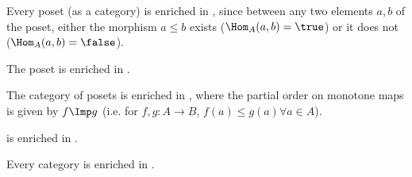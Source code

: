 \begin{example}
    \label{ex:enrichbool}Every poset (as a category) is enriched in \Bool, since between any two elements $a,b$ of the poset, either the morphism $a \leq b$ exists ($\Hom_A(a,b) = \true$) or it does not ($\Hom_A(a,b) = \false$).
\end{example}

\begin{example}
    The poset \Bool is enriched in \Bool.
\end{example}

\begin{example}
    The category \Pos of posets is enriched in \Pos, where the partial order on monotone maps is given by $f \Imp g$ (i.e. for $f,g : A \to B$, $f(a) \leq g(a) \forall a \in A$).
\end{example}

%

\begin{example}
    \Category is enriched in \Category.
\end{example}

\begin{example}
    Every category is enriched in \Set.
\end{example}


